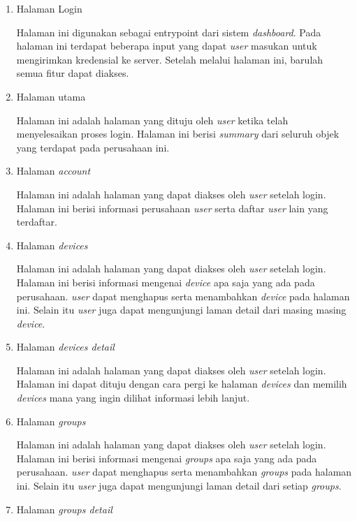 \begin{enumerate}
  \item Halaman Login

        Halaman ini digunakan sebagai entrypoint dari sistem \textit{dashboard}. Pada halaman ini terdapat beberapa input yang dapat \textit{user} masukan untuk mengirimkan kredensial ke server. Setelah melalui halaman ini, barulah semua fitur dapat diakses.

  \item Halaman utama

        Halaman ini adalah halaman yang dituju oleh \textit{user} ketika telah menyelesaikan proses login. Halaman ini berisi \textit{summary} dari seluruh objek yang terdapat pada perusahaan ini.

  \item Halaman \textit{account}

        Halaman ini adalah halaman yang dapat diakses oleh \textit{user} setelah login. Halaman ini berisi informasi perusahaan \textit{user} serta daftar \textit{user} lain yang terdaftar.

  \item Halaman \textit{devices}

        Halaman ini adalah halaman yang dapat diakses oleh \textit{user} setelah login. Halaman ini berisi informasi mengenai \textit{device} apa saja yang ada pada perusahaan. \textit{user} dapat menghapus serta menambahkan \textit{device} pada halaman ini. Selain itu \textit{user} juga dapat mengunjungi laman detail dari masing masing \textit{device}.

  \item Halaman \textit{devices detail}

        Halaman ini adalah halaman yang dapat diakses oleh \textit{user} setelah login. Halaman ini dapat dituju dengan cara pergi ke halaman \textit{devices} dan memilih \textit{devices} mana yang ingin dilihat informasi lebih lanjut.


  \item Halaman \textit{groups}

        Halaman ini adalah halaman yang dapat diakses oleh \textit{user} setelah login. Halaman ini berisi informasi mengenai \textit{groups} apa saja yang ada pada perusahaan. \textit{user} dapat menghapus serta menambahkan \textit{groups} pada halaman ini. Selain itu \textit{user} juga dapat mengunjungi laman detail dari setiap \textit{groups}.

  \item Halaman \textit{groups detail}


\end{enumerate}
